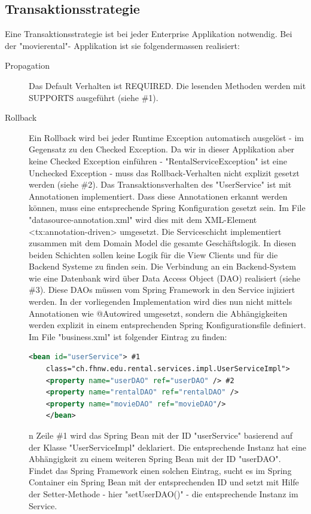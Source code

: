 \documentclass[a4paper,10pt]{scrreprt}
\begin{document}
\subsection{Transaktionsstrategie}
Eine Transaktionsstrategie ist bei jeder Enterprise Applikation notwendig. Bei der "movierental"-
Applikation ist sie folgendermassen realisiert:
\begin{description}
 \item [Propagation]Das Default Verhalten ist REQUIRED. Die lesenden Methoden werden mit SUPPORTS
ausgeführt (siehe \#1).
\item[Rollback]Ein Rollback wird bei jeder Runtime Exception automatisch ausgelöst - im Gegensatz zu den
Checked Exception. Da wir in dieser Applikation aber keine Checked Exception einführen -
"RentalServiceException" ist eine Unchecked Exception - muss das Rollback-Verhalten nicht
explizit gesetzt werden (siehe \#2).
Das Transaktionsverhalten des "UserService" ist mit Annotationen implementiert. Dass diese
Annotationen erkannt werden können, muss eine entsprechende Spring Konfiguration gesetzt sein.
Im File "datasource-annotation.xml" wird dies mit dem XML-Element <tx:annotation-driven>
umgesetzt.
Die Serviceschicht implementiert zusammen mit dem Domain Model die gesamte Geschäftslogik. In
diesen beiden Schichten sollen keine Logik für die View Clients und für die Backend Systeme zu
finden sein.
Die Verbindung an ein Backend-System wie eine Datenbank wird über Data Access Object (DAO)
realisiert (siehe \#3). Diese DAOs müssen vom Spring Framework in den Service injiziert werden. In
der vorliegenden Implementation wird dies nun nicht mittels Annotationen wie @Autowired
umgesetzt, sondern die Abhängigkeiten werden explizit in einem entsprechenden Spring
Konfigurationsfile definiert. Im File "business.xml" ist folgender Eintrag zu finden:
\begin{lstlisting}[language=xml]
	<bean id="userService"> #1
	class="ch.fhnw.edu.rental.services.impl.UserServiceImpl">
	<property name="userDAO" ref="userDAO" /> #2
	<property name="rentalDAO" ref="rentalDAO" />
	<property name="movieDAO" ref="movieDAO"/>
	</bean>
\end{lstlisting}
n Zeile \#1 wird das Spring Bean mit der ID "userService" basierend auf der Klasse
"UserServiceImpl" deklariert. Die entsprechende Instanz hat eine Abhängigkeit zu einem weiteren
Spring Bean mit der ID "userDAO". Findet das Spring Framework einen solchen Eintrag, sucht es im
Spring Container ein Spring Bean mit der entsprechenden ID und setzt mit Hilfe der Setter-Methode
- hier "setUserDAO()" - die entsprechende Instanz im Service.
 
\end{description}
\end{document}
